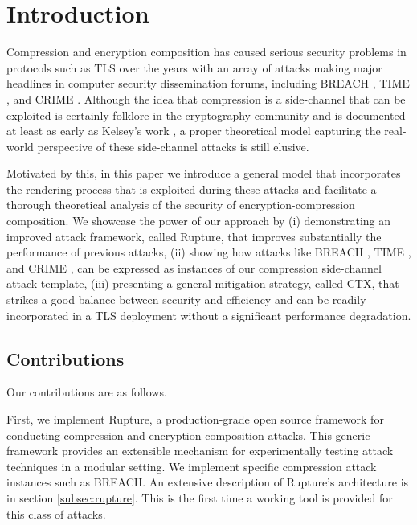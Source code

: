 \section{Introduction}\label{sec:prev}

Compression and encryption composition has caused serious security problems in
protocols such as TLS \cite{dierks2008tls} over the years with an array of
attacks making major headlines in computer security dissemination forums,
including BREACH \cite{gluck2013breach}, TIME \cite{be2013perfect}, and CRIME
\cite{duong2012crime}. Although the idea that compression is a side-channel that
can be exploited is certainly folklore in the cryptography community and is
documented at least as early as Kelsey's work \cite{kelsey2002compression}, a
proper theoretical model capturing the real-world perspective of these
side-channel attacks is still elusive.

Motivated by this, in this paper we introduce a general model that incorporates
the rendering process that is exploited during these attacks and facilitate a
thorough theoretical analysis of the security of encryption-compression
composition. We showcase the power of our approach by (i) demonstrating an
improved attack framework, called Rupture, that improves substantially the
performance of previous attacks, (ii) showing how attacks like BREACH
\cite{gluck2013breach}, TIME \cite{be2013perfect}, and CRIME
\cite{duong2012crime}, can be expressed as instances of our compression
side-channel attack template, (iii) presenting a general mitigation strategy,
called CTX, that strikes a good balance between security and efficiency and can
be readily incorporated in a TLS deployment without a significant performance
degradation.

\subsection{Contributions}
Our contributions are as follows.

First, we implement Rupture\footnotemark[1], a production-grade open source
framework for conducting compression and encryption composition attacks.  This
generic framework provides an extensible mechanism for experimentally testing
attack techniques in a modular setting. We implement specific compression attack
instances such as BREACH. An extensive description of Rupture's architecture is
in section \ref{subsec:rupture}. This is the first time a working tool is
provided for this class of attacks.


